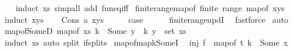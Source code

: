 \begin{isabellebody}
%
\isadelimproof
\ \ %
\endisadelimproof
%
\isatagproof
{}\isamarkupfalse%
\ {\isacharparenleft}{\kern0pt}induct\ xs{\isacharparenright}{\kern0pt}\ {\isacharparenleft}{\kern0pt}simp{\isacharunderscore}{\kern0pt}all\ add{\isacharcolon}{\kern0pt}\ fun{\isacharunderscore}{\kern0pt}eq{\isacharunderscore}{\kern0pt}iff{\isacharparenright}{\kern0pt}%
\endisatagproof
{\isafoldproof}%
%
\isadelimproof
\isanewline
%
\endisadelimproof
\isanewline
{}\isamarkupfalse%
\ finite{\isacharunderscore}{\kern0pt}range{\isacharunderscore}{\kern0pt}map{\isacharunderscore}{\kern0pt}of{\isacharcolon}{\kern0pt}\ {\isachardoublequoteopen}finite\ {\isacharparenleft}{\kern0pt}range\ {\isacharparenleft}{\kern0pt}map{\isacharunderscore}{\kern0pt}of\ xys{\isacharparenright}{\kern0pt}{\isacharparenright}{\kern0pt}{\isachardoublequoteclose}\isanewline
%
\isadelimproof
%
\endisadelimproof
%
\isatagproof
{}\isamarkupfalse%
\ {\isacharparenleft}{\kern0pt}induct\ xys{\isacharparenright}{\kern0pt}\isanewline
\ \ \isamarkupfalse%
\ {\isacharparenleft}{\kern0pt}Cons\ a\ xys{\isacharparenright}{\kern0pt}\isanewline
\ \ \isamarkupfalse%
\ \isamarkupfalse%
\ {\isacharquery}{\kern0pt}case\isanewline
\ \ \ \ \isamarkupfalse%
\ finite{\isacharunderscore}{\kern0pt}range{\isacharunderscore}{\kern0pt}updI\ \isamarkupfalse%
\ fastforce\isanewline
{}\isamarkupfalse%
\ auto%
\endisatagproof
{\isafoldproof}%
%
\isadelimproof
\isanewline
%
\endisadelimproof
\isanewline
{}\isamarkupfalse%
\ map{\isacharunderscore}{\kern0pt}of{\isacharunderscore}{\kern0pt}SomeD{\isacharcolon}{\kern0pt}\ {\isachardoublequoteopen}map{\isacharunderscore}{\kern0pt}of\ xs\ k\ {\isacharequal}{\kern0pt}\ Some\ y\ {\isasymLongrightarrow}\ {\isacharparenleft}{\kern0pt}k{\isacharcomma}{\kern0pt}\ y{\isacharparenright}{\kern0pt}\ {\isasymin}\ set\ xs{\isachardoublequoteclose}\isanewline
%
\isadelimproof
\ \ %
\endisadelimproof
%
\isatagproof
{}\isamarkupfalse%
\ {\isacharparenleft}{\kern0pt}induct\ xs{\isacharparenright}{\kern0pt}\ {\isacharparenleft}{\kern0pt}auto\ split{\isacharcolon}{\kern0pt}\ if{\isacharunderscore}{\kern0pt}splits{\isacharparenright}{\kern0pt}%
\endisatagproof
{\isafoldproof}%
%
\isadelimproof
\isanewline
%
\endisadelimproof
\isanewline
{}\isamarkupfalse%
\ map{\isacharunderscore}{\kern0pt}of{\isacharunderscore}{\kern0pt}mapk{\isacharunderscore}{\kern0pt}SomeI{\isacharcolon}{\kern0pt}\isanewline
\ \ {\isachardoublequoteopen}inj\ f\ {\isasymLongrightarrow}\ map{\isacharunderscore}{\kern0pt}of\ t\ k\ {\isacharequal}{\kern0pt}\ Some\ x\ {\isasymLongrightarrow}\isanewline

\end{isabellebody}
